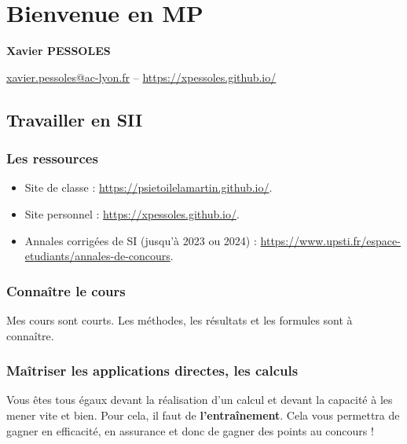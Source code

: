\renewcommand{\repExo}{\repRel/PSI_Cy_01_ModelisationSystemes/Ch_02_RevisionsSLCI/}
\renewcommand{\nomExo}{01_Modelisation_Perf_Fiche}
\graphicspath{{\repStyle/png}{\repExo\nomExo/images}}
%


\setchapterpreamble[u]{\margintoc}

\chapter*{Bienvenue en MP}
\setcounter{chapter}{1}

\begin{center}
\Large
\textsf{\textbf{Xavier PESSOLES}}
\normalsize 

\vspace{.5cm} 

\url{xavier.pessoles@ac-lyon.fr} -- \url{https://xpessoles.github.io/}
\normalsize
\end{center}
\section{Travailler en SII}
\subsection{Les ressources}
\begin{itemize}
\item Site de classe : \url{https://psietoilelamartin.github.io/}.
\item Site personnel : \url{https://xpessoles.github.io/}.
\item Annales corrigées de SI (jusqu'à 2023 ou 2024) : \url{https://www.upsti.fr/espace-etudiants/annales-de-concours}. 

\end{itemize}
\subsection{Connaître le cours}
Mes cours sont courts. Les méthodes, les résultats et les formules sont à connaître. 

\subsection{Maîtriser les applications directes, les calculs}
Vous êtes tous égaux devant la réalisation d'un calcul et devant la capacité à les mener vite et bien. 
Pour cela, il faut de \textbf{l’entraînement}. Cela vous permettra de gagner en efficacité, en assurance et donc de gagner des points au concours !

